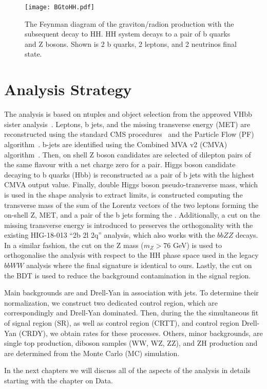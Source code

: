 \begin{figure}[!htb]%
  \begin{center}
    \texttt{[image: BGtoHH.pdf]}
    \caption{ The Feynman diagram of the graviton/radion production with the subsequent decay to HH. HH system decays to a pair of b quarks and Z bosons. Shown is 2 b quarks, 2 leptons, and 2 neutrinos final state.
    }
    \label{fig:BGtoHH}
  \end{center}
\end{figure}


\section{Analysis Strategy}

The analysis is based on ntuples and object selection from the approved VHbb sister analysis~\cite{VHbb_inspire}. Leptons, b jets, and the missing transverse energy (MET) are reconstructed using the standard CMS procedures~\cite{CMSreco} and the Particle Flow (PF) algorithm~\cite{PFalgo}. b-jets are identified using the Combined MVA v2 (CMVA) algorithm~\cite{BTagtwiki}. Then, on shell Z boson candidates are selected of dilepton pairs of the same flavour with a net charge zero for a pair. Higgs boson candidate decaying to b quarks (Hbb) is reconstructed as a pair of b jets with the highest CMVA output value. Finally, double Higgs boson pseudo-transverse mass, which is used in the shape analysis to extract limits, is constructed computing the transverse mass of the sum of the Lorentz vectors of the two leptons forming the on-shell Z, MET, and a pair of the b jets forming the \HBB. Additionally, a cut on the missing transverse energy is introduced to preserves the orthogonality with the existing HIG-18-013 ``2b 2l 2q'' analysis, which also works with the $bbZZ$ decays. In a similar fashion, the cut on the Z mass ($m_Z > 76$ GeV) is used to orthogonalise the analysis with respect to the HH phase space used in the legacy $bbWW$ analysis where the final signature is identical to ours. Lastly, the cut on the BDT is used to reduce the background contamination in the signal region.

Main backgrounds are \ttbar and Drell-Yan in association with jets. To determine their normalization, we construct two dedicated control region, which are correspondingly \ttbar and Drell-Yan dominated. Then, during the the simultaneous fit of signal region (SR), as well as control region \ttbar (CRTT), and control region Drell-Yan (CRDY), we obtain rates for these processes. Others, minor backgrounds, are single top production, diboson samples (WW, WZ, ZZ), and ZH production and are determined from the Monte Carlo (MC) simulation. 

In the next chapters we will discuss all of the aspects of the analysis in details starting with the chapter on Data. 
